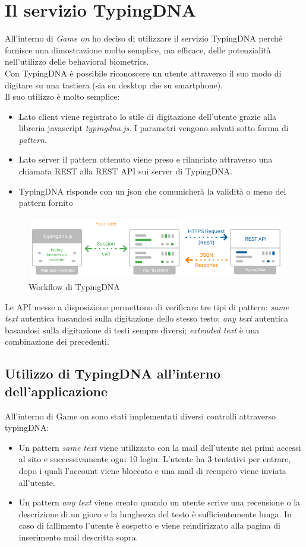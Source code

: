 \section{Il servizio TypingDNA}
All'interno di \emph{Game on} ho deciso di utilizzare il servizio TypingDNA\cite{tdna} perché fornisce una dimostrazione molto semplice, ma efficace, delle potenzialità nell'utilizzo delle behavioral biometrics.\\
Con TypingDNA è possibile riconoscere un utente attraverso il suo modo di digitare su una tastiera (sia su desktop che su smartphone).\\
Il suo utilizzo è molto semplice: 
\begin{itemize}
    \item Lato client viene registrato lo stile di digitazione dell'utente grazie alla libreria javascript \emph{typingdna.js}. I parametri vengono salvati sotto forma di \emph{pattern}.
    \item Lato server il pattern ottenuto viene preso e rilanciato attraverso una chiamata REST alla REST API sui server di TypingDNA.
    \item TypingDNA risponde con un json che comunicherà la validità o meno del pattern fornito
\end{itemize}
\begin{figure}[hbt!]
    \centering
    \includegraphics[width=\textwidth]{typingDNA_workflow}
    \caption{Workflow di TypingDNA}
\end{figure}
\FloatBarrier
Le API messe a disposizione permettono di verificare tre tipi di pattern: \emph{same text} autentica basandosi sulla digitazione dello stesso testo; \emph{any text} autentica basandosi sulla digitazione di testi sempre diversi; \emph{extended text} è una combinazione dei precedenti.
\subsection{Utilizzo di TypingDNA all'interno dell'applicazione}
All'interno di Game on sono stati implementati diversi controlli attraverso typingDNA: 
\begin{itemize}
    \item Un pattern \emph{same text} viene utilizzato con la mail dell'utente nei primi accessi al sito e successivamente ogni 10 login. L'utente ha 3 tentativi per entrare, dopo i quali l'account viene bloccato e una mail di recupero viene inviata all'utente.
    \item Un pattern \emph{any text} viene creato quando un utente scrive una recensione o la descrizione di un gioco e la lunghezza del testo è sufficientemente lunga. In caso di fallimento l'utente è sospetto e viene reindirizzato alla pagina di inserimento mail descritta sopra.
\end{itemize}